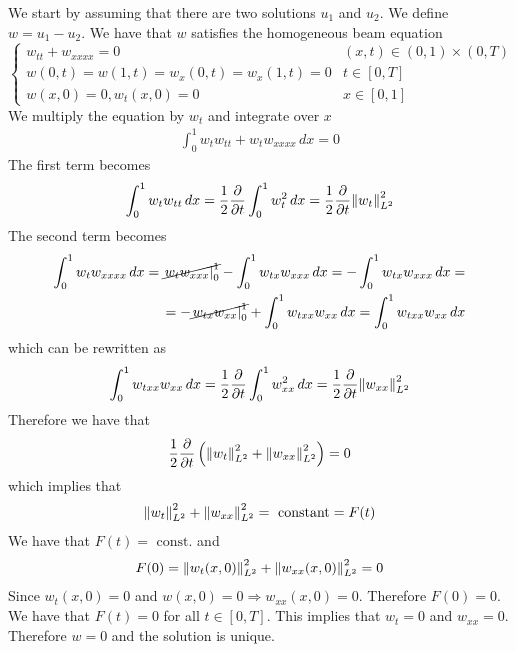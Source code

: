 We start by assuming that there are two solutions \(u_1\) and \(u_2\). We define \(w = u_1 - u_2\). We have that \(w\) satisfies the homogeneous beam equation
\[
    \begin{cases}
        w_{tt} + w_{xxxx} = 0 & (x,t) \in (0,1) \times (0, T) \\
        w(0, t) = w(1, t) = w_x(0, t) = w_x(1, t) = 0 & t \in [0, T] \\
        w(x, 0) = 0, w_t(x, 0) = 0 & x \in [0, 1]
    \end{cases}
\]
We multiply the equation by \(w_t\) and integrate over \(x\)
\[
    \begin{split}
        \int_0^1 w_t w_{tt} + w_t w_{xxxx} \, dx = 0
    \end{split}
\]
The first term becomes
\[
    \begin{split}
        \int_0^1 w_t w_{tt} \, dx = \frac{1}{2} \frac{\partial}{\partial t} \int_0^1 w_t^2 \, dx = \frac{1}{2} \frac{\partial}{\partial t} \norm{w_t}_{L^2}^2
    \end{split}
\]
The second term becomes
\[
    \begin{split}
        \int_0^1 w_t w_{xxxx} \, dx = \cancel{\left. w_t w_{xxx} \right|_0^1} - \int_0^1 w_{tx} w_{xxx} \, dx = - \int_0^1 w_{tx} w_{xxx} \, dx = \\
        = -\cancel{\left. w_{tx} w_{xx} \right|_0^1} + \int_0^1 w_{txx} w_{xx} \, dx = \int_0^1 w_{txx} w_{xx} \, dx
    \end{split}
\]
which can be rewritten as
\[
    \begin{split}
        \int_0^1 w_{txx} w_{xx} \, dx = \frac{1}{2} \frac{\partial}{\partial t} \int_0^1 w_{xx}^2 \, dx = \frac{1}{2} \frac{\partial}{\partial t} \norm{w_{xx}}_{L^2}^2
    \end{split}
\]
Therefore we have that
\[
    \begin{split}
        \frac{1}{2} \frac{\partial}{\partial t} \left(\norm{w_t}_{L^2}^2 + \norm{w_{xx}}_{L^2}^2\right) = 0
    \end{split}
\]
which implies that
\[
    \begin{split}
        \norm{w_t}_{L^2}^2 + \norm{w_{xx}}_{L^2}^2 = \text{ constant} = F(t)
    \end{split}
\]
We have that \(F(t) = \text{ const.}\) and 
\[
    \begin{split}
        F(0) = \norm{w_t(x, 0)}_{L^2}^2 + \norm{w_{xx}(x, 0)}_{L^2}^2 = 0
    \end{split}
\]
Since \(w_t(x, 0) = 0\) and \(w(x,0) = 0 \Rightarrow w_{xx}(x, 0) = 0\). Therefore \(F(0) = 0\). We have that \(F(t) = 0\) for all \(t \in [0, T]\). This implies that \(w_t = 0\) and \(w_{xx} = 0\). Therefore \(w = 0\) and the solution is unique.


